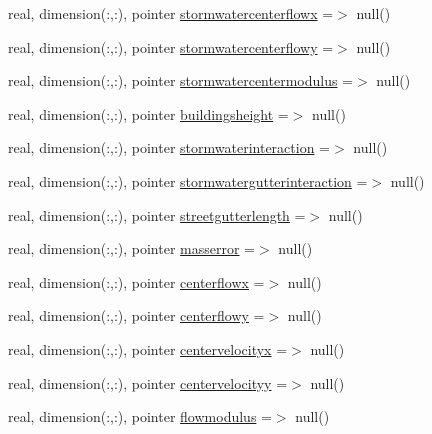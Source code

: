\begin{DoxyCompactItemize}
\item 
real, dimension(\+:,\+:), pointer \mbox{\hyperlink{structmodulerunoff_1_1t__runoff_ad2ea436413d2ecce4bb5bf550c2781e8}{stormwatercenterflowx}} =$>$ null()
\item 
real, dimension(\+:,\+:), pointer \mbox{\hyperlink{structmodulerunoff_1_1t__runoff_aba7b8d8d26c83e0cdf907cd2763ad3cd}{stormwatercenterflowy}} =$>$ null()
\item 
real, dimension(\+:,\+:), pointer \mbox{\hyperlink{structmodulerunoff_1_1t__runoff_a8fe2271f40562e28ceefc6d3e20f5f8b}{stormwatercentermodulus}} =$>$ null()
\item 
real, dimension(\+:,\+:), pointer \mbox{\hyperlink{structmodulerunoff_1_1t__runoff_acb3924a9190464f6141207806c426370}{buildingsheight}} =$>$ null()
\item 
real, dimension(\+:,\+:), pointer \mbox{\hyperlink{structmodulerunoff_1_1t__runoff_ad5cc8c8793dc874683c28e5732caf3b0}{stormwaterinteraction}} =$>$ null()
\item 
real, dimension(\+:,\+:), pointer \mbox{\hyperlink{structmodulerunoff_1_1t__runoff_a326966f98136185ef92402e0b589e362}{stormwatergutterinteraction}} =$>$ null()
\item 
real, dimension(\+:,\+:), pointer \mbox{\hyperlink{structmodulerunoff_1_1t__runoff_afbd43e7be904c3606fbb828bbeca91de}{streetgutterlength}} =$>$ null()
\item 
real, dimension(\+:,\+:), pointer \mbox{\hyperlink{structmodulerunoff_1_1t__runoff_af1808bc7280ee550f9bc3c4d20dd79da}{masserror}} =$>$ null()
\item 
real, dimension(\+:,\+:), pointer \mbox{\hyperlink{structmodulerunoff_1_1t__runoff_a45a75be783c846510ed70a8a63f4d9cd}{centerflowx}} =$>$ null()
\item 
real, dimension(\+:,\+:), pointer \mbox{\hyperlink{structmodulerunoff_1_1t__runoff_ac99c087ab7bed31e0afdc2ef4705fdb3}{centerflowy}} =$>$ null()
\item 
real, dimension(\+:,\+:), pointer \mbox{\hyperlink{structmodulerunoff_1_1t__runoff_a5729566376e27b8ff5fe178a1383f323}{centervelocityx}} =$>$ null()
\item 
real, dimension(\+:,\+:), pointer \mbox{\hyperlink{structmodulerunoff_1_1t__runoff_a7a9c3ab3ef8d32351c67c3f01fcb1665}{centervelocityy}} =$>$ null()
\item 
real, dimension(\+:,\+:), pointer \mbox{\hyperlink{structmodulerunoff_1_1t__runoff_a7af06aaa1cafc7dabc7d6db9d74d07c7}{flowmodulus}} =$>$ null()
\item 

\end{DoxyCompactItemize}
